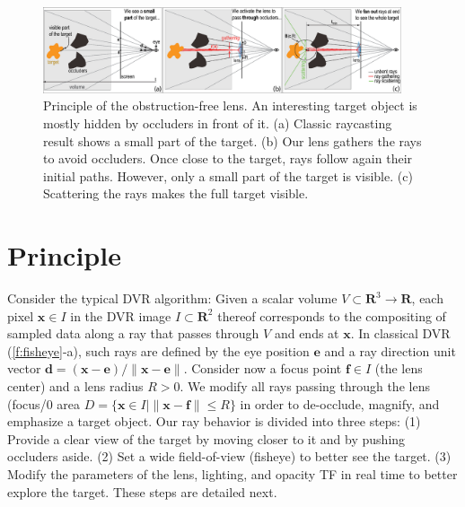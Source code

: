 \begin{figure}[htbp]
\centering
\vspace{-0.15cm}
\includegraphics [width=0.94\textwidth]{images/principle.eps}
\vspace{-0.15cm}
\caption{Principle of the obstruction-free lens. An interesting target object is mostly hidden by occluders in front of it. (a) Classic raycasting result shows a small part of the target. (b) Our lens gathers the rays to avoid occluders. Once close to the target, rays follow again their initial paths. However, only a small part of the target is visible. (c) Scattering the rays makes the full target visible.}
\label{f:fisheye}
\vspace{-0.15cm}
\end{figure}

\vspace{-0.15cm}
\section{Principle}
\label{sec:principle}
%
%
Consider the typical DVR algorithm: Given a scalar volume $V \subset \mathbf{R}^3 \rightarrow \mathbf{R}$, each pixel $\mathbf{x} \in I$ in the DVR image $I \subset \mathbf{R}^2$ thereof corresponds to the compositing of sampled data along a ray that passes through $V$ and ends at $\mathbf{x}$. In classical DVR (\autoref{f:fisheye}-a), such rays are defined by the eye position $\mathbf{e}$ and a ray direction unit vector $\mathbf{d} = (\mathbf{x} - \mathbf{e}) / \| \mathbf{x} - \mathbf{e} \|$. Consider now a focus point $\mathbf{f} \in I$ (the lens center) and a lens radius $R > 0$. We modify all rays passing through the lens (focus/0 area $D = \{\mathbf{x} \in I | \| \mathbf{x} - \mathbf{f} \| \leq R\}$ in order to de-occlude, magnify, and emphasize a target object. Our ray behavior is divided into three steps: (1) Provide a clear view of the target by moving closer to it and by pushing occluders aside. (2) Set a wide field-of-view (fisheye) to better see the target. (3) Modify the parameters of the lens, lighting, and opacity TF in real time to better explore the target. These steps are detailed next.

